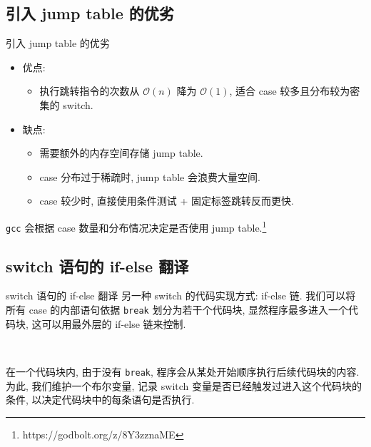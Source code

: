 \documentclass{ctexbeamer}
\begin{document}
\subsection*{引入 jump table 的优劣}

\begin{frame}{引入 jump table 的优劣}
  \begin{itemize}
    \item 优点: 
      \begin{itemize}
        \item 执行跳转指令的次数从 $\mathcal O(n)$ 降为 $\mathcal O(1)$, 适合 case 较多且分布较为密集的 switch.
      \end{itemize}
    \item 缺点:
      \begin{itemize}
        \item 需要额外的内存空间存储 jump table.
        \item case 分布过于稀疏时, jump table 会浪费大量空间.
        \item case 较少时, 直接使用条件测试 + 固定标签跳转反而更快.
      \end{itemize}
  \end{itemize}

  \pause
  \qquad \texttt{gcc} 会根据 case 数量和分布情况决定是否使用 jump table.\footnote{https://godbolt.org/z/8Y3zznaME}
\end{frame}

\subsection*{switch 语句的 if-else 翻译}

\begin{frame}{switch 语句的 if-else 翻译}
  \qquad 另一种 switch 的代码实现方式: if-else 链. 我们可以将所有 case 的内部语句依据 \texttt{break} 划分为若干个代码块, 显然程序最多进入一个代码块, 这可以用最外层的 if-else 链来控制.

  \,

  \pause
  \qquad 在一个代码块内, 由于没有 \texttt{break}, 程序会从某处开始顺序执行后续代码块的内容. 为此, 我们维护一个布尔变量, 记录 switch 变量是否已经触发过进入这个代码块的条件, 以决定代码块中的每条语句是否执行.
\end{frame}
\end{document}
